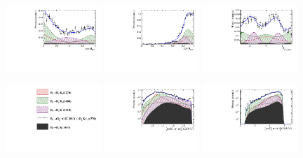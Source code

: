 \begin{figure}[h]
		\includegraphics[width=0.32\textwidth, height = !]{figs/lassoFit/LASSO/h_cosTheta_Kpi_mod.pdf} 
		\includegraphics[width=0.32\textwidth, height = !]{figs/lassoFit/LASSO/h_cosTheta_Dspi_mod.pdf} 
		\includegraphics[width=0.32\textwidth, height = !]{figs/lassoFit/LASSO/h_phi_Kpi_Dspi_mod.pdf} 

		\caption{} 		
				\label{fig:lassoFit}

	\centering
		\includegraphics[width=0.32\textwidth, height = !]{figs/lassoFit/LASSO/leg.pdf} 
		\includegraphics[width=0.32\textwidth, height = !]{figs/lassoFit/LASSO/m_Kpipi_mod_log.pdf} 
		\includegraphics[width=0.32\textwidth, height = !]{figs/lassoFit/LASSO/m_Dspipi_mod_log.pdf} 


\end{figure}
